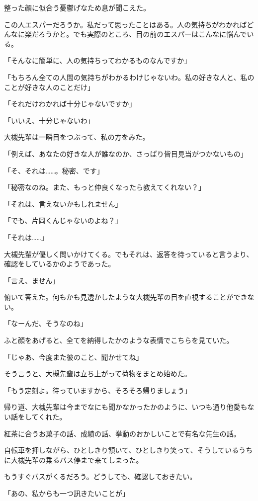 \documentclass[a4paper,dvipdfmx,12pt]{jsarticle}
\begin{document}
整った顔に似合う憂鬱げなため息が聞こえた。

この人エスパーだろうか。私だって思ったことはある。人の気持ちがわかればどんなに楽だろうかと。でも実際のところ、目の前のエスパーはこんなに悩んでいる。

「そんなに簡単に、人の気持ちってわかるものなんですか」

「もちろん全ての人間の気持ちがわかるわけじゃないわ。私の好きな人と、私のことが好きな人のことだけ」

「それだけわかれば十分じゃないですか」

「いいえ、十分じゃないわ」

大槻先輩は一瞬目をつぶって、私の方をみた。

「例えば、あなたの好きな人が誰なのか、さっぱり皆目見当がつかないもの」

「そ、それは……。秘密、です」

「秘密なのね。また、もっと仲良くなったら教えてくれない？」

「それは、言えないかもしれません」

「でも、片岡くんじゃないのよね？」

「それは……」

大槻先輩が優しく問いかけてくる。でもそれは、返答を待っていると言うより、確認をしているかのようであった。

「言え、ません」

俯いて答えた。何もかも見透かしたような大槻先輩の目を直視することができない。

「なーんだ、そうなのね」

ふと顔をあげると、全てを納得したかのような表情でこちらを見ていた。

「じゃあ、今度また彼のこと、聞かせてね」

そう言うと、大槻先輩は立ち上がって荷物をまとめ始めた。

「もう定刻よ。待っていますから、そろそろ帰りましょう」

\vspace{0.2in}

帰り道、大槻先輩は今までなにも聞かなかったかのように、いつも通り他愛もない話をしてくれた。

紅茶に合うお菓子の話、成績の話、挙動のおかしいことで有名な先生の話。

自転車を押しながら、ひとしきり頷いて、ひとしきり笑って、そうしているうちに大槻先輩の乗るバス停まで来てしまった。

もうすぐバスがくるだろう。どうしても、確認しておきたい。

「あの、私からも一つ訊きたいことが」
\end{document}
